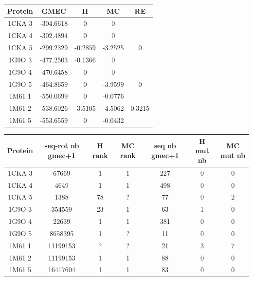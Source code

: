 \documentclass[a4paper,12pt]{article}
\begin{document}
    \clearpage


    \begin{table}[h]
      \centering

      \begin{tabular}{|c|c|c|c|c|}


        \hline
        Protein & GMEC & H & MC & RE \\
        \hline
        1CKA 3 & -304.6618 & 0 & 0 & \\
        1CKA 4 & -302.4894 & 0 & 0 & \\
        1CKA 5 & -299.2329 & -0.2859 & -3.2525 & 0 \\
        1G9O 3 & -477.2503 & -0.1366 & 0 & \\
        1G9O 4 & -470.6458 & 0 & 0 & \\
        1G9O 5 & -464.8659 & 0 & -3.9599 &  0 \\
        1M61 1 & -550.0699 & 0 & -0.0776 & \\
        1M61 2 & -538.6026 & -3.5105 & -4.5062 & 0.3215 \\
        1M61 5 & -553.6559 & 0 & -0.0432 & \\
        
        \hline


 \end{tabular}      
 \label{tab_1}      
\end{table}


    \begin{table}[h]
      \centering

      \begin{tabular}{|c|c|c|c|c|c|c|}


        \hline
        Protein & seq-rot nb gmec+1 & H rank  & MC rank  & seq nb gmec+1 & H mut nb & MC mut nb \\
        \hline
        1CKA 3 & 67669 & 1 & 1 & 227 & 0 & 0 \\
        1CKA 4 & 4649 & 1 & 1 & 498 & 0 & 0 \\
        1CKA 5 & 1388 & 78 & ? & 77 & 0 & 2 \\
        1G9O 3 & 354559 & 23 & 1 & 63 & 1 & 0 \\
        1G9O 4 & 22639 & 1 & 1 & 381 & 0 & 0 \\
        1G9O 5 & 8658395 & 1 & ? &  11 & 0 & 0 \\
        1M61 1 & 11199153 & ? & ? & 21 & 3 & 7 \\
        1M61 2 & 11199153 & 1 & 1 & 88 & 0 & 0 \\
        1M61 5 & 16417604 & 1 & 1 & 83 & 0 & 0 \\
        
        \hline


 \end{tabular}      
 \label{tab_2}      
\end{table}
\end{document}
